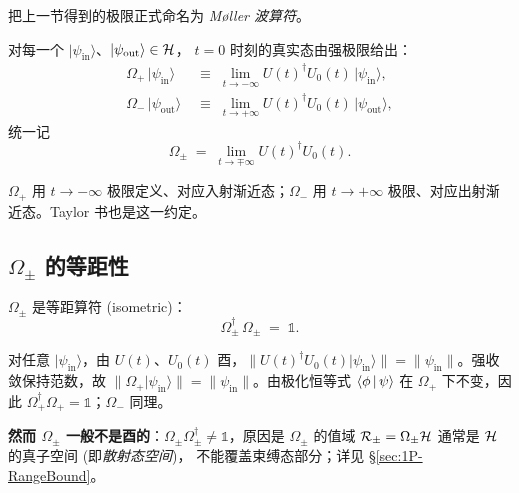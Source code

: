 把上一节得到的极限正式命名为 \emph{Møller 波算符}。

\begin{definition}
\label{def:1P-Moller}
对每一个 $|\psi_{\text{in}}\rangle$、$|\psi_{\text{out}}\rangle\in\mathcal{H}$，
$t=0$ 时刻的真实态由强极限给出：
\begin{align}
  \Omega_+\,|\psi_{\text{in}}\rangle
    &\;\equiv\;\lim_{t\to-\infty} U(t)^{\dagger} U_0(t)\,|\psi_{\text{in}}\rangle,
    \label{eq:1P-Omega-plus}\\
  \Omega_-\,|\psi_{\text{out}}\rangle
    &\;\equiv\;\lim_{t\to+\infty} U(t)^{\dagger} U_0(t)\,|\psi_{\text{out}}\rangle,
    \label{eq:1P-Omega-minus}
\end{align}
统一记
\begin{equation}
  \Omega_\pm \;=\;\lim_{t\to\mp\infty} U(t)^{\dagger} U_0(t).
  \label{eq:1P-Omega-def}
\end{equation}
\end{definition}

\begin{remark}[符号约定]
$\Omega_+$ 用 $t\to -\infty$ 极限定义、对应入射渐近态；$\Omega_-$ 用
$t\to +\infty$ 极限、对应出射渐近态。Taylor 书也是这一约定。
\end{remark}

\subsection{$\Omega_\pm$ 的等距性}
\label{ssec:1P-isometry}

\begin{theorem}[Isometry]
\label{thm:1P-isometry}
$\Omega_\pm$ 是等距算符 (isometric)：
\begin{equation}
  \Omega_\pm^{\dagger}\,\Omega_\pm \;=\; \mathbb{1}.
  \label{eq:1P-isom}
\end{equation}
\end{theorem}

\begin{proof*}
对任意 $|\psi_{\text{in}}\rangle$，由 $U(t)$、$U_0(t)$ 酉，$\|U(t)^{\dagger}U_0(t)
|\psi_{\text{in}}\rangle\|=\|\psi_{\text{in}}\|$。强收敛保持范数，故
$\|\Omega_+|\psi_{\text{in}}\rangle\|=\|\psi_{\text{in}}\|$。由极化恒等式
$\left\langle \phi \,\middle|\, \psi \right\rangle$ 在 $\Omega_+$ 下不变，因此 $\Omega_+^{\dagger}\Omega_+
=\mathbb{1}$；$\Omega_-$ 同理。
\end{proof*}

\textbf{然而 $\Omega_\pm$ 一般不是酉的}：$\Omega_\pm \Omega_\pm^{\dagger}
\neq \mathbb{1}$，原因是 $\Omega_\pm$ 的值域 $\mathcal{R}_\pm
=\Omega_\pm \mathcal{H}$ 通常是 $\mathcal{H}$ 的真子空间 (即\emph{散射态空间})，
不能覆盖束缚态部分；详见 \S\ref{sec:1P-RangeBound}。

